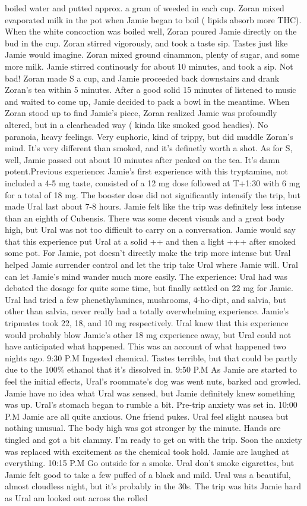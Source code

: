 \documentclass[12pt]{book}
\begin{document}
boiled water and putted approx. a gram of weeded in each cup. Zoran mixed evaporated milk in the pot when Jamie began to boil ( lipids absorb more THC). When the white concoction was boiled well, Zoran poured Jamie directly on the bud in the cup. Zoran stirred vigorously, and took a taste sip. Tastes just like Jamie would imagine. Zoran mixed ground cinammon, plenty of sugar, and some more milk. Jamie stirred continously for about 10 minutes, and took a sip. Not bad! Zoran made S a cup, and Jamie proceeded back downstairs and drank Zoran's tea within 5 minutes. After a good solid 15 minutes of listened to music and waited to come up, Jamie decided to pack a bowl in the meantime. When Zoran stood up to find Jamie's piece, Zoran realized Jamie was profoundly altered, but in a clearheaded way ( kinda like smoked good headies). No paranoia, heavy feelings. Very euphoric, kind of trippy, but did muddle Zoran's mind. It's very different than smoked, and it's definetly worth a shot. As for S, well, Jamie passed out about 10 minutes after peaked on the tea. It's damn potent.Previous experience: Jamie's first experience with this tryptamine, not included a 4-5 mg taste, consisted of a 12 mg dose followed at T+1:30 with 6 mg for a total of 18 mg. The booster dose did not significantly intensify the trip, but made Ural last about 7-8 hours. Jamie felt like the trip was definitely less intense than an eighth of Cubensis. There was some decent visuals and a great body high, but Ural was not too difficult to carry on a conversation. Jamie would say that this experience put Ural at a solid ++ and then a light +++ after smoked some pot. For Jamie, pot doesn't directly make the trip more intense but Ural helped Jamie surrender control and let the trip take Ural where Jamie will. Ural can let Jamie's mind wander much more easily. The experience: Ural had was debated the dosage for quite some time, but finally settled on 22 mg for Jamie. Ural had tried a few phenethylamines, mushrooms, 4-ho-dipt, and salvia, but other than salvia, never really had a totally overwhelming experience. Jamie's tripmates took 22, 18, and 10 mg respectively. Ural knew that this experience would probably blow Jamie's other 18 mg experience away, but Ural could not have anticipated what happened. This was an account of what happened two nights ago. 9:30 P.M Ingested chemical. Tastes terrible, but that could be partly due to the 100\% ethanol that it's dissolved in. 9:50 P.M As Jamie are started to feel the initial effects, Ural's roommate's dog was went nuts, barked and growled. Jamie have no idea what Ural was sensed, but Jamie definitely knew something was up. Ural's stomach began to rumble a bit. Pre-trip anxiety was set in. 10:00 P.M Jamie are all quite anxious. One friend pukes. Ural feel slight nausea but nothing unusual. The body high was got stronger by the minute. Hands are tingled and got a bit clammy. I'm ready to get on with the trip. Soon the anxiety was replaced with excitement as the chemical took hold. Jamie are laughed at everything. 10:15 P.M Go outside for a smoke. Ural don't smoke cigarettes, but Jamie felt good to take a few puffed of a black and mild. Ural was a beautiful, almost cloudless night, but it's probably in the 30s. The trip was hits Jamie hard as Ural am looked out across the rolled 
\end{document}
